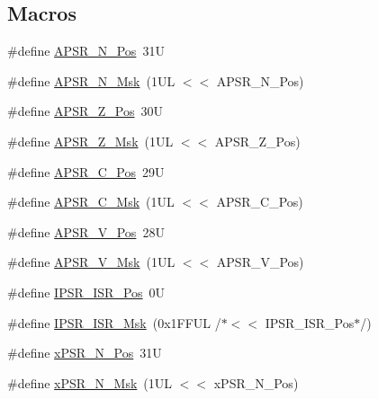 \subsection*{Macros}
\begin{DoxyCompactItemize}
\item 
\#define \hyperlink{group___c_m_s_i_s___c_o_r_e_gac469528d210043c7bd3f12f0e6824766}{A\+P\+S\+R\+\_\+\+N\+\_\+\+Pos}~31U
\item 
\#define \hyperlink{group___c_m_s_i_s___c_o_r_e_gadbc2cf55a026f661b53fadfcf822cef1}{A\+P\+S\+R\+\_\+\+N\+\_\+\+Msk}~(1\+U\+L $<$$<$ A\+P\+S\+R\+\_\+\+N\+\_\+\+Pos)
\item 
\#define \hyperlink{group___c_m_s_i_s___c_o_r_e_ga3661286d108b1aca308d7445685eae3a}{A\+P\+S\+R\+\_\+\+Z\+\_\+\+Pos}~30U
\item 
\#define \hyperlink{group___c_m_s_i_s___c_o_r_e_ga1deb4d1aa72bb83d1f79329406f15711}{A\+P\+S\+R\+\_\+\+Z\+\_\+\+Msk}~(1\+U\+L $<$$<$ A\+P\+S\+R\+\_\+\+Z\+\_\+\+Pos)
\item 
\#define \hyperlink{group___c_m_s_i_s___c_o_r_e_ga6cf72aa6f09a168f9e5beda1a4a887b9}{A\+P\+S\+R\+\_\+\+C\+\_\+\+Pos}~29U
\item 
\#define \hyperlink{group___c_m_s_i_s___c_o_r_e_ga6d47803fbad455bc10bd1ce59f2f335d}{A\+P\+S\+R\+\_\+\+C\+\_\+\+Msk}~(1\+U\+L $<$$<$ A\+P\+S\+R\+\_\+\+C\+\_\+\+Pos)
\item 
\#define \hyperlink{group___c_m_s_i_s___c_o_r_e_gac62830f67679ccd11658c4172c3e6ea7}{A\+P\+S\+R\+\_\+\+V\+\_\+\+Pos}~28U
\item 
\#define \hyperlink{group___c_m_s_i_s___c_o_r_e_ga33305d6701356bff6890b315fe8b5489}{A\+P\+S\+R\+\_\+\+V\+\_\+\+Msk}~(1\+U\+L $<$$<$ A\+P\+S\+R\+\_\+\+V\+\_\+\+Pos)
\item 
\#define \hyperlink{group___c_m_s_i_s___c_o_r_e_ga0e34027584d02c43811ae908a5ca9adf}{I\+P\+S\+R\+\_\+\+I\+S\+R\+\_\+\+Pos}~0U
\item 
\#define \hyperlink{group___c_m_s_i_s___c_o_r_e_gaf013a4579a64d1f21f56ea9f1b33ab56}{I\+P\+S\+R\+\_\+\+I\+S\+R\+\_\+\+Msk}~(0x1\+F\+F\+U\+L /$\ast$$<$$<$ I\+P\+S\+R\+\_\+\+I\+S\+R\+\_\+\+Pos$\ast$/)
\item 
\#define \hyperlink{group___c_m_s_i_s___c_o_r_e_ga031eb1b8ebcdb3d602d0b9f2ec82a7ae}{x\+P\+S\+R\+\_\+\+N\+\_\+\+Pos}~31U
\item 
\#define \hyperlink{group___c_m_s_i_s___c_o_r_e_gaf600f4ff41b62cf2f3b0a59b6d2e93d6}{x\+P\+S\+R\+\_\+\+N\+\_\+\+Msk}~(1\+U\+L $<$$<$ x\+P\+S\+R\+\_\+\+N\+\_\+\+Pos)
\item 
$$
\end{DoxyCompactItemize}
